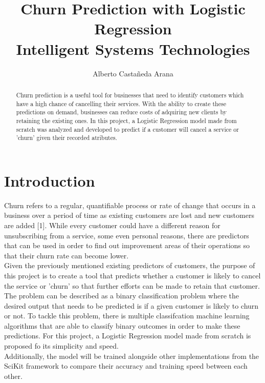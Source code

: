 \documentclass[letterpaper, 10 pt, conference]{ieeeconf}
\title{\bf
Churn Prediction with Logistic Regression \large  \\
Intelligent Systems Technologies
}
\author{Alberto Castañeda Arana %
}
\begin{document}
\maketitle
\thispagestyle{empty}
\pagestyle{empty}


\begin{abstract}
Churn prediction is a useful tool for businesses that need to identify customers which have a high chance of cancelling their services.
With the ability to create these predictions on demand, businesses can reduce costs of adquiring new clients by retaining the existing ones. In this project, a Logistic Regression model made from scratch was analyzed and developed to
predict if a customer will cancel a service or 'churn' given their recorded atributes. 
\end{abstract}

\section{ Introduction }
Churn refers to a regular, quantifiable process or rate of change that occurs in a business over a period of time as existing customers are
lost and new customers are added [1]. While every customer could have a different reason for unsubscribing from a service, some even personal reasons,
there are predictors that can be used in order to find out improvement areas of their operations 
so that their churn rate can become lower. \\

Given the previously mentioned existing predictors of customers, the purpose of this project is to create a tool that predicts whether a customer is likely to cancel the service
or 'churn' so that further efforts can be made to retain that customer. \\


The problem can be described as a binary classification problem where the desired output that needs to be predicted is if a given customer is likely to churn or not.
To tackle this problem, there is multiple classifcation machine learning algorithms that are able to classify binary outcomes in order to make these predictions.
For this project, a Logistic Regression model made from scratch is proposed fo its simplicity and speed. \\

Additionally, the model will be trained alongside other implementations from the SciKit framework to compare their accuracy and training speed between each other.
\end{document}
